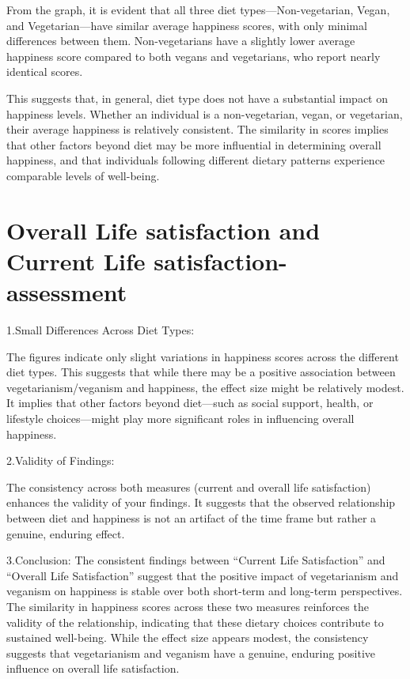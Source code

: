 \documentclass[
]{article}
\begin{document}
From the graph, it is evident that all three diet
types---Non-vegetarian, Vegan, and Vegetarian---have similar average
happiness scores, with only minimal differences between them.
Non-vegetarians have a slightly lower average happiness score compared
to both vegans and vegetarians, who report nearly identical scores.

This suggests that, in general, diet type does not have a substantial
impact on happiness levels. Whether an individual is a non-vegetarian,
vegan, or vegetarian, their average happiness is relatively consistent.
The similarity in scores implies that other factors beyond diet may be
more influential in determining overall happiness, and that individuals
following different dietary patterns experience comparable levels of
well-being.

\section{Overall Life satisfaction and Current Life
satisfaction-assessment}\label{overall-life-satisfaction-and-current-life-satisfaction-assessment}

1.Small Differences Across Diet Types:

The figures indicate only slight variations in happiness scores across
the different diet types. This suggests that while there may be a
positive association between vegetarianism/veganism and happiness, the
effect size might be relatively modest. It implies that other factors
beyond diet---such as social support, health, or lifestyle
choices---might play more significant roles in influencing overall
happiness.

2.Validity of Findings:

The consistency across both measures (current and overall life
satisfaction) enhances the validity of your findings. It suggests that
the observed relationship between diet and happiness is not an artifact
of the time frame but rather a genuine, enduring effect.

3.Conclusion: The consistent findings between ``Current Life
Satisfaction'' and ``Overall Life Satisfaction'' suggest that the
positive impact of vegetarianism and veganism on happiness is stable
over both short-term and long-term perspectives. The similarity in
happiness scores across these two measures reinforces the validity of
the relationship, indicating that these dietary choices contribute to
sustained well-being. While the effect size appears modest, the
consistency suggests that vegetarianism and veganism have a genuine,
enduring positive influence on overall life satisfaction.
\end{document}

